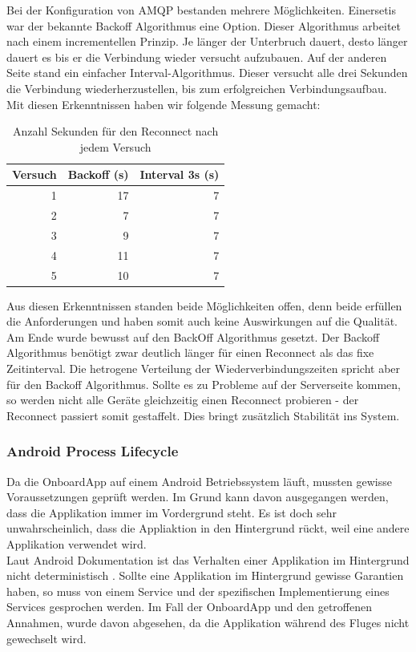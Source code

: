 Bei der Konfiguration von AMQP bestanden mehrere Möglichkeiten. Einersetis war der bekannte Backoff Algorithmus eine Option. Dieser Algorithmus arbeitet nach einem incrementellen Prinzip. Je länger der Unterbruch dauert, desto länger dauert es bis er die Verbindung wieder versucht aufzubauen. Auf der anderen Seite stand ein einfacher Interval-Algorithmus. Dieser versucht alle drei Sekunden die Verbindung wiederherzustellen, bis zum erfolgreichen Verbindungsaufbau. \\
Mit diesen Erkenntnissen haben wir folgende Messung gemacht:
\begin{table}
	\centering
	\begin{tabular}{|r|r|r|}
		\hline
		\textbf{Versuch} & \textbf{Backoff (s) } & \textbf{Interval 3s (s)} \\
		\hline
		1 & 17 & 7 \\
		2 &	7 & 7 \\
		3 & 9 & 7 \\
 		4 & 11 & 7 \\
		5 & 10 & 7 \\
		\hline
	\end{tabular}
	\caption{Anzahl Sekunden für den Reconnect nach jedem Versuch}
\end{table}
Aus diesen Erkenntnissen standen beide Möglichkeiten offen, denn beide erfüllen die Anforderungen und haben somit auch keine Auswirkungen auf die Qualität. Am Ende wurde bewusst auf den BackOff Algorithmus gesetzt. Der Backoff Algorithmus benötigt zwar deutlich länger für einen Reconnect als das fixe Zeitinterval. Die hetrogene Verteilung der Wiederverbindungszeiten spricht aber für den Backoff Algorithmus. Sollte es zu Probleme auf der Serverseite kommen, so werden nicht alle Geräte gleichzeitig einen Reconnect probieren - der Reconnect passiert somit gestaffelt. Dies bringt zusätzlich Stabilität ins System.

\subsubsection{Android Process Lifecycle} 
Da die OnboardApp auf einem Android Betriebssystem läuft, mussten gewisse Voraussetzungen geprüft werden. Im Grund kann davon ausgegangen werden, dass die Applikation immer im Vordergrund steht. Es ist doch sehr unwahrscheinlich, dass die Appliaktion in den Hintergrund rückt, weil eine andere Applikation verwendet wird. \\
Laut Android Dokumentation ist das Verhalten einer Applikation im Hintergrund nicht deterministisch \cite{androidGuide}. Sollte eine Applikation im Hintergrund gewisse Garantien haben, so muss von einem Service und der spezifischen Implementierung eines Services gesprochen werden. Im Fall der OnboardApp und den getroffenen Annahmen, wurde davon abgesehen, da die Applikation während des Fluges nicht gewechselt wird.\\


